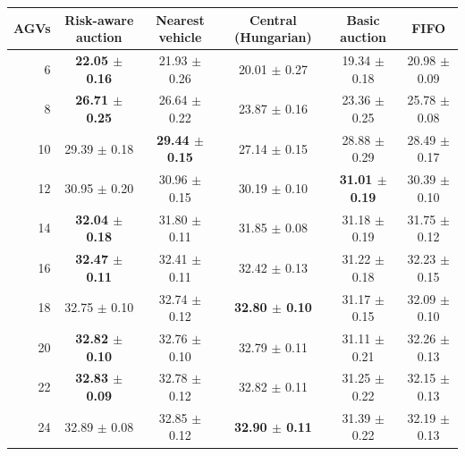 \begin{tabular}{rccccc}
\toprule
AGVs & Risk-aware auction & Nearest vehicle & Central (Hungarian) & Basic auction & FIFO \\
\midrule
6 & \textbf{22.05 $\pm$ 0.16} & 21.93 $\pm$ 0.26 & 20.01 $\pm$ 0.27 & 19.34 $\pm$ 0.18 & 20.98 $\pm$ 0.09 \\
8 & \textbf{26.71 $\pm$ 0.25} & 26.64 $\pm$ 0.22 & 23.87 $\pm$ 0.16 & 23.36 $\pm$ 0.25 & 25.78 $\pm$ 0.08 \\
10 & 29.39 $\pm$ 0.18 & \textbf{29.44 $\pm$ 0.15} & 27.14 $\pm$ 0.15 & 28.88 $\pm$ 0.29 & 28.49 $\pm$ 0.17 \\
12 & 30.95 $\pm$ 0.20 & 30.96 $\pm$ 0.15 & 30.19 $\pm$ 0.10 & \textbf{31.01 $\pm$ 0.19} & 30.39 $\pm$ 0.10 \\
14 & \textbf{32.04 $\pm$ 0.18} & 31.80 $\pm$ 0.11 & 31.85 $\pm$ 0.08 & 31.18 $\pm$ 0.19 & 31.75 $\pm$ 0.12 \\
16 & \textbf{32.47 $\pm$ 0.11} & 32.41 $\pm$ 0.11 & 32.42 $\pm$ 0.13 & 31.22 $\pm$ 0.18 & 32.23 $\pm$ 0.15 \\
18 & 32.75 $\pm$ 0.10 & 32.74 $\pm$ 0.12 & \textbf{32.80 $\pm$ 0.10} & 31.17 $\pm$ 0.15 & 32.09 $\pm$ 0.10 \\
20 & \textbf{32.82 $\pm$ 0.10} & 32.76 $\pm$ 0.10 & 32.79 $\pm$ 0.11 & 31.11 $\pm$ 0.21 & 32.26 $\pm$ 0.13 \\
22 & \textbf{32.83 $\pm$ 0.09} & 32.78 $\pm$ 0.12 & 32.82 $\pm$ 0.11 & 31.25 $\pm$ 0.22 & 32.15 $\pm$ 0.13 \\
24 & 32.89 $\pm$ 0.08 & 32.85 $\pm$ 0.12 & \textbf{32.90 $\pm$ 0.11} & 31.39 $\pm$ 0.22 & 32.19 $\pm$ 0.13 \\
\bottomrule
\end{tabular}
